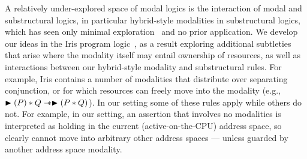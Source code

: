 \documentclass[acmsmall,screen,nonacm]{acmart}
\begin{document}
A relatively under-explored space of modal logics is the interaction of modal and substructural logics, 
in particular hybrid-style modalities in substructural logics, which has seen only minimal exploration~\cite{dovsen1992modal,restall1993modalities,d1997grafting,kamide2002kripke,licata2017fibrational} and no prior 
application. We develop our ideas in the Iris program logic~\cite{jung2018iris}, as a result exploring additional subtleties 
that arise where the modality itself may entail ownership of resources, as well as interactions between our hybrid-style 
modality and substructural rules.  For example, Iris contains a number of modalities that distribute over separating 
conjunction, or for which resources can freely move into the modality 
(e.g., $\blacktriangleright(P)\ast Q \mathrel{-\!\!\ast} \blacktriangleright(P\ast Q)$). In our setting some of these rules 
apply while others do not. For example, in our setting, an assertion that involves no modalities is interpreted as 
holding in the current (active-on-the-CPU) address space, so clearly cannot move into arbitrary other address spaces 
--- unless guarded by another address space modality.
%
%
%
%
%
%
%
%
%
%
%
\end{document}

